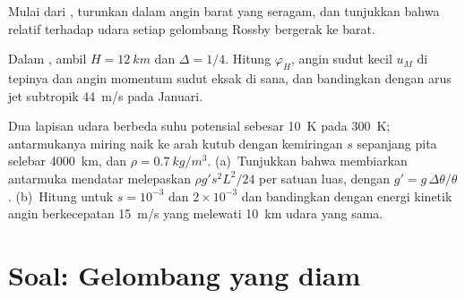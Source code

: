 \begin{exercise}[$\star\star\star$]\label{exo:b3:atmospheric-dynamics:10}
Mulai dari , turunkan  dalam angin barat yang seragam, dan tunjukkan bahwa
relatif terhadap udara setiap gelombang Rossby bergerak ke barat.
\end{exercise}

\begin{exercise}[$\star\star\star$]\label{exo:b3:atmospheric-dynamics:11}
Dalam , ambil $H = \qty{12}{km}$ dan $\Delta = 1/4$. Hitung
$\varphi_H$, angin sudut kecil $u_M$ di tepinya dan
angin momentum sudut eksak di sana, dan bandingkan dengan arus jet subtropik
\qty{44}{m/s} pada  Januari.
\end{exercise}

\begin{exercise}[$\star\star\star$]\label{exo:b3:atmospheric-dynamics:12}
Dua lapisan udara berbeda suhu potensial sebesar \qty{10}{K} pada
\qty{300}{K}; antarmukanya miring naik ke arah kutub dengan kemiringan $s$
sepanjang pita selebar \qty{4000}{km}, dan $\rho = \qty{0.7}{kg/m^3}$. (a)~Tunjukkan
bahwa membiarkan antarmuka mendatar melepaskan $\rho g' s^2L^2/24$ per satuan
luas, dengan $g' = g\,\Delta\theta/\theta$. (b)~Hitung untuk $s = 10^{-3}$ dan
$2\times10^{-3}$ dan bandingkan dengan energi kinetik angin berkecepatan \qty{15}{m/s}
yang melewati \qty{10}{km} udara yang sama.
\end{exercise}

\section{Soal: Gelombang yang diam}


